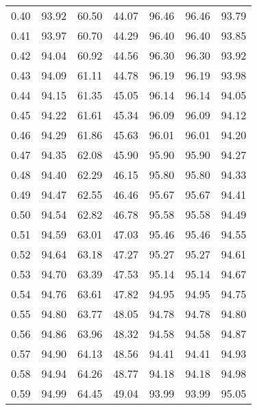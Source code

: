 \begin{tabular}{|c|c|c|c|c|c|c|}
      0.40 &     93.92 &     60.50 &      44.07 &   96.46 &      96.46 &         93.79 \\
      0.41 &     93.97 &     60.70 &      44.29 &   96.40 &      96.40 &         93.85 \\
      0.42 &     94.04 &     60.92 &      44.56 &   96.30 &      96.30 &         93.92 \\
      0.43 &     94.09 &     61.11 &      44.78 &   96.19 &      96.19 &         93.98 \\
      0.44 &     94.15 &     61.35 &      45.05 &   96.14 &      96.14 &         94.05 \\
      0.45 &     94.22 &     61.61 &      45.34 &   96.09 &      96.09 &         94.12 \\
      0.46 &     94.29 &     61.86 &      45.63 &   96.01 &      96.01 &         94.20 \\
      0.47 &     94.35 &     62.08 &      45.90 &   95.90 &      95.90 &         94.27 \\
      0.48 &     94.40 &     62.29 &      46.15 &   95.80 &      95.80 &         94.33 \\
      0.49 &     94.47 &     62.55 &      46.46 &   95.67 &      95.67 &         94.41 \\
      0.50 &     94.54 &     62.82 &      46.78 &   95.58 &      95.58 &         94.49 \\
      0.51 &     94.59 &     63.01 &      47.03 &   95.46 &      95.46 &         94.55 \\
      0.52 &     94.64 &     63.18 &      47.27 &   95.27 &      95.27 &         94.61 \\
      0.53 &     94.70 &     63.39 &      47.53 &   95.14 &      95.14 &         94.67 \\
      0.54 &     94.76 &     63.61 &      47.82 &   94.95 &      94.95 &         94.75 \\
      0.55 &     94.80 &     63.77 &      48.05 &   94.78 &      94.78 &         94.80 \\
      0.56 &     94.86 &     63.96 &      48.32 &   94.58 &      94.58 &         94.87 \\
      0.57 &     94.90 &     64.13 &      48.56 &   94.41 &      94.41 &         94.93 \\
      0.58 &     94.94 &     64.26 &      48.77 &   94.18 &      94.18 &         94.98 \\
      0.59 &     94.99 &     64.45 &      49.04 &   93.99 &      93.99 &         95.05 \\

\end{tabular}
